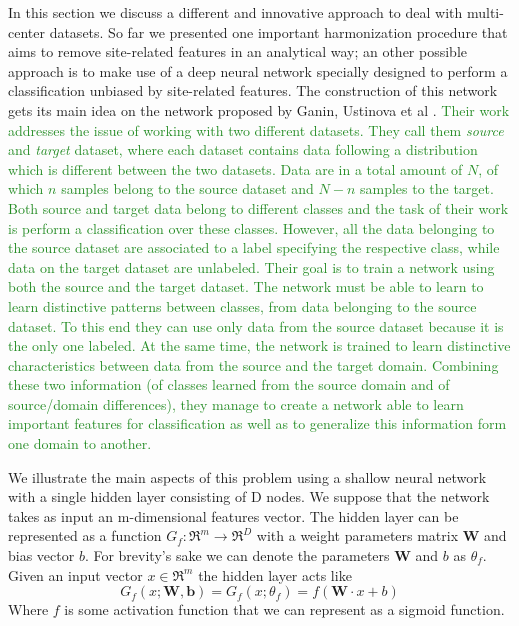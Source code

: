 \documentclass[11pt]{report}
\begin{document}
In this section we discuss a different and innovative approach to deal with multi-center datasets.
So far we presented one important harmonization procedure that aims to remove site-related features in an analytical way; an other possible approach is to make use of a deep neural network specially designed to perform a classification unbiased by site-related features.
The construction of this network gets its main idea on the network proposed by Ganin, Ustinova et al \cite{ganin2016}.
\textcolor{ForestGreen}{
Their work addresses the issue of working with two different datasets.
They call them \emph{source} and \emph{target} dataset, where each dataset contains data following a distribution which is different between the two datasets.
Data are in a total amount of $N$, of which $n$ samples belong to the source dataset and $N-n$ samples to the target.
Both source and target data belong to different classes and the task of their work is perform a classification over these classes.
However, all the data belonging to the source dataset are associated to a label specifying the respective class, while data on the target dataset are unlabeled.
Their goal is to train a network using both the source and the target dataset.
The network must be able to learn to learn distinctive patterns between classes, from data belonging to the source dataset.
To this end they can use only data from the source dataset because it is the only one labeled.
At the same time, the network is trained to learn distinctive characteristics between data from the source and the target domain.
Combining these two information (of classes learned from the source domain and of source/domain differences), they manage to create a network able to learn important features for classification as well as to generalize this information form one domain to another.
}

We illustrate the main aspects of this problem using a shallow neural network with a single hidden layer consisting of D nodes.
We suppose that the network takes as input an m-dimensional features vector.
The hidden layer can be represented as a function $G_f : \Re^m \rightarrow \Re^D$ with a weight parameters matrix $\mathbf{W}$ and bias vector $b$. For brevity's sake we can denote the parameters $\mathbf{W}$ and $b$ as $\theta_f$.
Given an input vector $x \in \Re^m$ the hidden layer acts like
\begin{equation}
G_f(x; \mathbf{W}, \mathbf{b}) =G_f(x; \theta_f)  = f(\mathbf{W}\cdot x + b)
\end{equation}
Where $f$ is some activation function that we can represent as a sigmoid function.
\end{document}
